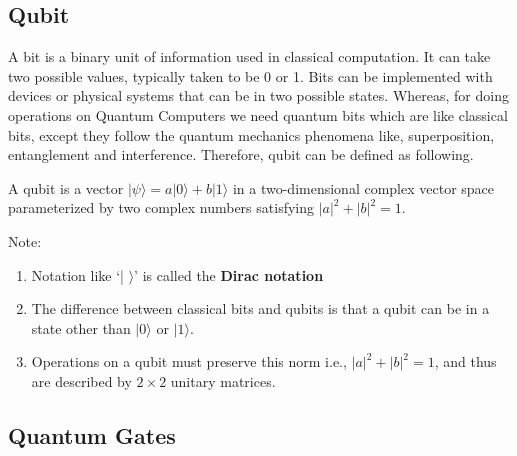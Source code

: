 \documentclass[12pt]{report}
\begin{document}
\subsection{Qubit}
A bit is a binary unit of information used in classical computation. It can take two possible values, typically taken to be 0 or 1. Bits can be implemented with devices or physical systems that can be in two possible states. Whereas, for doing operations on Quantum Computers we need quantum bits which are like classical bits, except they follow the quantum mechanics phenomena like, superposition, entanglement and interference. Therefore, qubit can be defined as following.
\begin{defn} 
A qubit is a vector $|\psi\rangle = a|0\rangle + b|1\rangle$ in a two-dimensional complex vector space parameterized by two complex numbers satisfying $|a|^2 + |b|^2 = 1$.
\end{defn}
Note:
\begin{enumerate}
\item Notation like ‘| $\rangle$’ is called the \textbf{Dirac notation}
\item The difference between classical bits and qubits is that a qubit can be in a state other than $|0\rangle$ or $|1\rangle$.
\item Operations on a qubit must preserve this norm i.e., $|a|^2 + |b|^2 = 1$, and thus are described by $2\times2$ unitary matrices.
\end{enumerate}
\subsection{Quantum Gates}
\end{document}
